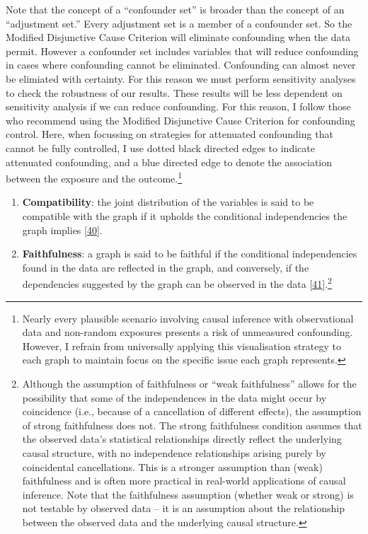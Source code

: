 \documentclass[
  singlecolumn]{article}
\begin{document}
Note that the concept of a ``confounder set'' is broader than the
concept of an ``adjustment set.'' Every adjustment set is a member of a
confounder set. So the Modified Disjunctive Cause Criterion will
eliminate confounding when the data permit. However a confounder set
includes variables that will reduce confounding in cases where
confounding cannot be eliminated. Confounding can almost never be
elimiated with certainty. For this reason we must perform sensitivity
analyses to check the robustness of our results. These results will be
less dependent on sensitivity analysis if we can reduce confounding. For
this reason, I follow those who recommend using the Modified Disjunctive
Cause Criterion for confounding control. Here, when focussing on
strategies for attenuated confounding that cannot be fully controlled, I
use dotted black directed edges to indicate attenuated confounding, and
a blue directed edge to denote the association between the exposure and
the outcome.\footnote{Nearly every plausible scenario involving causal
  inference with observational data and non-random exposures presents a
  risk of unmeasured confounding. However, I refrain from universally
  applying this visualisation strategy to each graph to maintain focus
  on the specific issue each graph represents.}

\begin{enumerate}
\def\labelenumi{\arabic{enumi}.}
\setcounter{enumi}{7}
\item
  \textbf{Compatibility}: the joint distribution of the variables is
  said to be compatible with the graph if it upholds the conditional
  independencies the graph implies
  {[}\protect\hyperlink{ref-pearl2009a}{40}{]}.
\item
  \textbf{Faithfulness}: a graph is said to be faithful if the
  conditional independencies found in the data are reflected in the
  graph, and conversely, if the dependencies suggested by the graph can
  be observed in the data
  {[}\protect\hyperlink{ref-pearl1995a}{41}{]}.\footnote{Although the
    assumption of faithfulness or ``weak faithfulness'' allows for the
    possibility that some of the independences in the data might occur
    by coincidence (i.e., because of a cancellation of different
    effects), the assumption of strong faithfulness does not. The strong
    faithfulness condition assumes that the observed data's statistical
    relationships directly reflect the underlying causal structure, with
    no independence relationships arising purely by coincidental
    cancellations. This is a stronger assumption than (weak)
    faithfulness and is often more practical in real-world applications
    of causal inference. Note that the faithfulness assumption (whether
    weak or strong) is not testable by observed data -- it is an
    assumption about the relationship between the observed data and the
    underlying causal structure.}
\end{enumerate}
\end{document}
